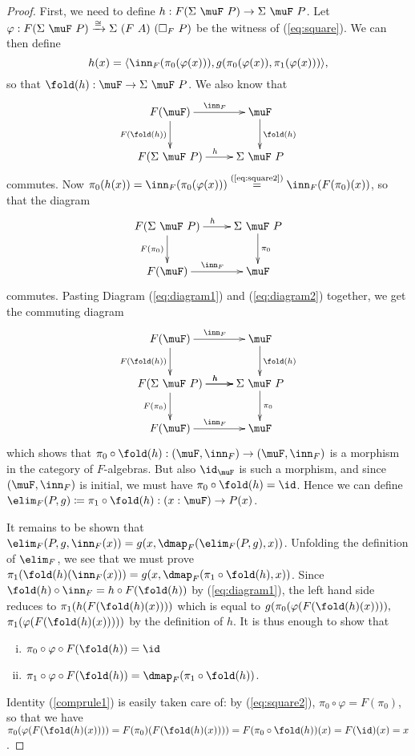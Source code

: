\documentclass{article}
\begin{document}
\begin{proof}
First, we need to define $h : F(\Sigma\ \muF\ P) \to \Sigma\ \muF\ P$. Let $\varphi : F (\Sigma\ \muF\ P) \xrightarrow{\cong} \Sigma\ (F\ A)\ (\square_F\ P)$ be the witness of (\ref{eq:square}). We can then define
\[
h(x) = \langle \inn_F(\pi_0(\varphi(x))), g(\pi_0(\varphi(x)),\pi_1(\varphi(x)))\rangle,
\]
so that $\fold(h) : \muF \to \Sigma\ \muF\ P$. We also know that
\begin{equation}
\label{eq:diagram1}
\xymatrix
{
F(\muF) \ar^{\inn_F}[r] \ar_{F(\fold(h))}[d] & \muF \ar^{\fold(h)}[d]\\
F(\Sigma\ \muF\ P) \ar^{h}[r] & \Sigma\ \muF\ P
}
\end{equation}
commutes. Now $\pi_0(h(x)) = \inn_F(\pi_0(\varphi(x))) \stackrel{(\text{\ref{eq:square2}})}{=} \inn_F(F(\pi_0)(x))$, so that the diagram
\begin{equation}
\label{eq:diagram2}
\xymatrix
{
F(\Sigma\ \muF\ P) \ar^{h}[r] \ar_{F(\pi_0)}[d] & \Sigma\ \muF\ P \ar^{\pi_0}[d] \\
F(\muF) \ar^{\inn_F}[r] & \muF 
}
\end{equation}
commutes. Pasting Diagram (\ref{eq:diagram1}) and (\ref{eq:diagram2}) together, we get the commuting diagram
\[
\xymatrix
{
F(\muF) \ar^{\inn_F}[r] \ar_{F(\fold(h))}[d] & \muF \ar^{\fold(h)}[d]\\
F(\Sigma\ \muF\ P) \ar^{h}[r] \ar^{h}[r] \ar_{F(\pi_0)}[d] & \Sigma\ \muF\ P \ar^{\pi_0}[d] \\
F(\muF) \ar^{\inn_F}[r] & \muF 
}
\]
which shows that $\pi_0 \circ \fold(h) : (\muF, \inn_F) \to (\muF,
\inn_F)$ is a morphism in the category of $F$-algebras. But also $\id_{\muF}$ is such a morphism, and since $ (\muF, \inn_F)$ is initial, we must have $\pi_0 \circ \fold(h) = \id$. Hence we can define $\elim_F(P, g) \coloneqq \pi_1 \circ \fold(h) : (x : \muF) \to P(x)$.

It remains to be shown that $\elim_F(P, g, \inn_F(x)) = g(x,
\dmap_F(\elim_F(P, g), x))$. Unfolding the definition of $\elim_F$, we
see that we must prove $\pi_1(\fold(h)(\inn_F(x))) = g(x,
\dmap_F(\pi_1\circ\fold(h), x))$. Since $\fold(h) \circ \inn_F = h \circ F(\fold(h))$ by (\ref{eq:diagram1}), the left hand side reduces to $\pi_1(h(F(\fold(h)(x))))$ which is equal to $g(\pi_0(\varphi(F(\fold(h)(x)))),$ $\pi_1(\varphi(F(\fold(h)(x)))))$ by the definition of $h$. It is thus enough to show that
\begin{enumerate}[(i)]
\item $\pi_0 \circ \varphi \circ F(\fold(h)) = \id$ \label{comprule1}
\item $\pi_1 \circ \varphi \circ F(\fold(h)) = \dmap_F(\pi_1\circ\fold(h))$. \label{comprule2}
\end{enumerate}
Identity (\ref{comprule1}) is easily taken care of: by (\ref{eq:square2}), $\pi_0 \circ \varphi = F(\pi_0)$, so that we have $\pi_0(\varphi(F(\fold(h)(x)))) = F(\pi_0)(F(\fold(h)(x)))) = F(\pi_0 \circ \fold(h))(x) = F(\id)(x) = x$.


\end{proof}
\end{document}
